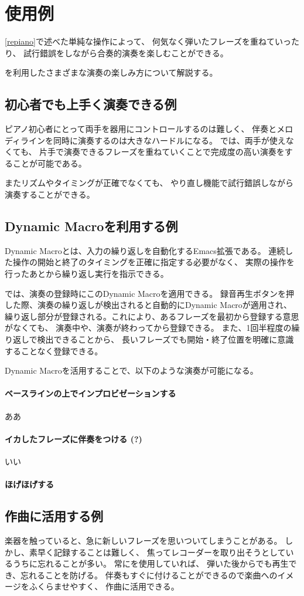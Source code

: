 \section{{\system}使用例}

\ref{repiano}で述べた単純な操作によって、
何気なく弾いたフレーズを重ねていったり、
試行錯誤をしながら合奏的演奏を楽しむことができる。

{\system}を利用したさまざまな演奏の楽しみ方について解説する。

\subsection{初心者でも上手く演奏できる例}
ピアノ初心者にとって両手を器用にコントロールするのは難しく、
伴奏とメロディラインを同時に演奏するのは大きなハードルになる。
{\system}では、両手が使えなくても、
片手で演奏できるフレーズを重ねていくことで完成度の高い演奏をすることが可能である。

またリズムやタイミングが正確でなくても、
やり直し機能で試行錯誤しながら演奏することができる。


\subsection{Dynamic Macroを利用する例}
Dynamic Macroとは、入力の繰り返しを自動化するEmacs拡張である。
連続した操作の開始と終了のタイミングを正確に指定する必要がなく、
実際の操作を行ったあとから繰り返し実行を指示できる。

{\system}では、演奏の登録時にこのDynamic Macroを適用できる。
録音再生ボタンを押した際、演奏の繰り返しが検出されると自動的にDynamic Macroが適用され、
繰り返し部分が登録される。これにより、あるフレーズを最初から登録する意思がなくても、
演奏中や、演奏が終わってから登録できる。
また、1回半程度の繰り返しで検出できることから、
長いフレーズでも開始・終了位置を明確に意識することなく登録できる。

Dynamic Macroを活用することで、以下のような演奏が可能になる。

\paragraph*{ベースラインの上でインプロビゼーションする}
ああ
\paragraph*{イカしたフレーズに伴奏をつける (?)}
いい
\paragraph*{ほげほげする}

\subsection{作曲に活用する例}
楽器を触っていると、急に新しいフレーズを思いついてしまうことがある。
しかし、素早く記録することは難しく、
焦ってレコーダーを取り出そうとしているうちに忘れることが多い。
常に{\system}を使用していれば、
弾いた後からでも再生でき、忘れることを防げる。
伴奏もすぐに付けることができるので楽曲へのイメージをふくらませやすく、
作曲に活用できる。
